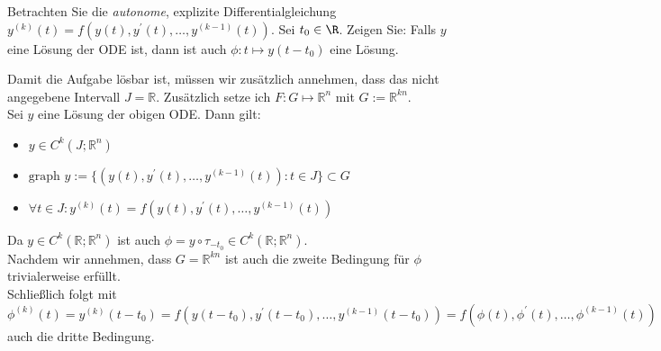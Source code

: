 \begin{exercise}

Betrachten Sie die \textit{autonome}, explizite Differentialgleichung $y^{(k)}(t) = f(y(t), y^\prime(t), \ldots, y^{(k-1)}(t))$. Sei $t_0 \in \R$. Zeigen Sie: Falls $y$ eine Lösung der ODE ist, dann ist auch $\phi: t \mapsto y(t - t_0)$ eine Lösung.

\end{exercise}

\begin{solution}
Damit die Aufgabe lösbar ist, müssen wir zusätzlich annehmen, dass das nicht angegebene
Intervall $J = \mathbb{R}$. Zusätzlich setze ich $F: G \mapsto \mathbb{R}^n$ mit $G := \mathbb{R}^{kn}$.\\
Sei $y$ eine Lösung der obigen ODE. Dann gilt:
\begin{itemize}
\item $y \in C^k(J;\mathbb{R}^n)$
\item $\text{graph~} y := \{(y(t), y^\prime(t), \ldots, y^{(k-1)}(t)): t \in J\} \subset G$
\item $\forall t \in J: y^{(k)}(t) = f(y(t), y^\prime(t), \ldots, y^{(k-1)}(t))$
\end{itemize}
Da $y \in C^k(\mathbb{R};\mathbb{R}^n)$ ist auch $\phi = y \circ \tau_{-t_0} \in C^k(\mathbb{R};\mathbb{R}^n)$. \\
Nachdem wir annehmen, dass $G = \mathbb{R}^{kn}$ ist auch die zweite Bedingung für $\phi$
trivialerweise erfüllt. \\
Schließlich folgt mit $\phi^{(k)}(t) = y^{(k)}(t-t_0) = f(y(t- t_0), y^\prime(t - t_0), \ldots, y^{(k-1)}(t-t_0))
= f(\phi(t), \phi^\prime(t), \ldots, \phi^{(k-1)}(t))$
auch die dritte Bedingung.
\end{solution}
